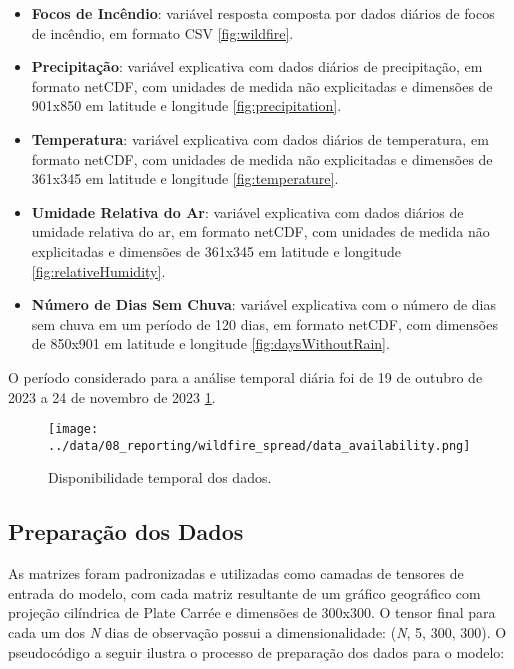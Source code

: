 \documentclass[journal]{IEEEtran}
\begin{document}
\begin{itemize}
    \item \textbf{Focos de Incêndio}: variável resposta composta por dados diários de focos de incêndio, em formato CSV \ref{fig:wildfire}\cite{terra_brasilis_dataset_focos}.
    \item \textbf{Precipitação}: variável explicativa com dados diários de precipitação, em formato netCDF, com unidades de medida não explicitadas e dimensões de 901x850 em latitude e longitude \ref{fig:precipitation}\cite{terra_brasilis_dataset_precipitacao}.
    \item \textbf{Temperatura}: variável explicativa com dados diários de temperatura, em formato netCDF, com unidades de medida não explicitadas e dimensões de 361x345 em latitude e longitude \ref{fig:temperature}\cite{terra_brasilis_dataset_temperatura}.
    \item \textbf{Umidade Relativa do Ar}: variável explicativa com dados diários de umidade relativa do ar, em formato netCDF, com unidades de medida não explicitadas e dimensões de 361x345 em latitude e longitude \ref{fig:relativeHumidity}\cite{terra_brasilis_dataset_umidade_relativa}.
    \item \textbf{Número de Dias Sem Chuva}: variável explicativa com o número de dias sem chuva em um período de 120 dias, em formato netCDF, com dimensões de 850x901 em latitude e longitude \ref{fig:daysWithoutRain}\cite{terra_brasilis_dataset_umidade_numero_dias_sem_chuva}.\newline
\end{itemize}

O período considerado para a análise temporal diária foi de 19 de outubro de 2023 a 24 de novembro de 2023 \ref{fig:figura_1}.

\begin{figure}[h]
    \centering
    \texttt{[image: ../data/08\_reporting/wildfire\_spread/data\_availability.png]}
    \caption{Disponibilidade temporal dos dados.}
    \label{fig:figura_1}
\end{figure}

\subsection{Preparação dos Dados}

As matrizes foram padronizadas e utilizadas como camadas de tensores de entrada do modelo, com cada matriz resultante de um gráfico geográfico com projeção cilíndrica de Plate Carrée e dimensões de 300x300. O tensor final para cada um dos \textit{N} dias de observação possui a dimensionalidade: (\textit{N}, 5, 300, 300). O pseudocódigo a seguir ilustra o processo de preparação dos dados para o modelo:
\end{document}
